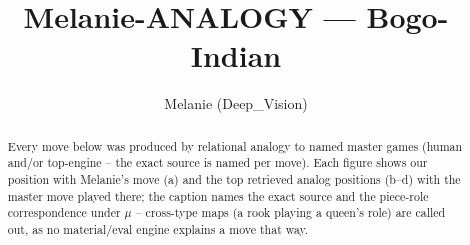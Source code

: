 \documentclass[11pt]{article}
\title{Melanie-ANALOGY — Bogo-Indian}
\author{Melanie (Deep\_Vision)}
\date{}
\begin{document}
\maketitle

\begin{abstract}Every move below was produced by relational analogy to named master games (human and/or top-engine -- the exact source is named per move). Each figure shows our position with Melanie's move (a) and the top retrieved analog positions (b--d) with the master move played there; the caption names the exact source and the piece-role correspondence under $\mu$ -- cross-type maps (a rook playing a queen's role) are called out, as no material/eval engine explains a move that way.\end{abstract}

\begin{figure}[p]\centering
\begin{subfigure}{0.46\textwidth}\centering
\resizebox{\linewidth}{!}{%
\newchessgame
\chessboard[
  setfen={r1b1k2r/ppppqppp/2n1pn2/8/2PP4/2P2NP1/P2BPP1P/R2QKB1R b KQkq - 0 7},
  showmover=false,
  pgfstyle=straightmove, color=movearrow, markmove={h7-h6}
]}
\caption{}
\end{subfigure}\hfill
\begin{subfigure}{0.46\textwidth}\centering
\resizebox{\linewidth}{!}{%
\newchessgame
\chessboard[
  setfen={r1bqkb1r/pp3ppp/2nppn2/2p5/4P3/2N2NP1/PPPP1PBP/R1BQK2R w KQkq - 4 6},
  showmover=false,
  pgfstyle=straightmove, color=movearrow, markmove={d2-d4}
]}
\caption{}
\end{subfigure}
\\[4pt]
\begin{subfigure}{0.46\textwidth}\centering
\resizebox{\linewidth}{!}{%
\newchessgame
\chessboard[
  setfen={r1bqkb1r/pp3ppp/2nppn2/2p5/4P3/2N2NP1/PPPP1PBP/R1BQK2R w KQkq - 4 6},
  showmover=false,
  pgfstyle=straightmove, color=movearrow, markmove={d2-d4}
]}
\caption{}
\end{subfigure}\hfill
\begin{subfigure}{0.46\textwidth}\centering
\resizebox{\linewidth}{!}{%
\newchessgame
\chessboard[
  setfen={r1bqkb1r/pp3ppp/2nppn2/2p5/4P3/2N2NP1/PPPP1PBP/R1BQK2R w KQkq - 4 6},
  showmover=false,
  pgfstyle=straightmove, color=movearrow, markmove={d2-d4}
]}
\caption{}
\end{subfigure}

\end{figure}
\end{document}
